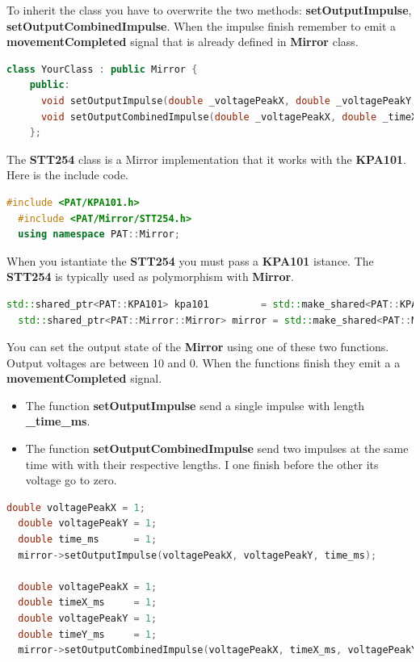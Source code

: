 To inherit the class you have to overwrite the two methods:
\textbf{setOutputImpulse}, \textbf{setOutputCombinedImpulse}. When the
impulse finish remember to emit a \textbf{movementCompleted} signal that
is already defined in \textbf{Mirror} class.

\begin{lstlisting}[language=c++, gobble=2]
  class YourClass : public Mirror {
    public:
      void setOutputImpulse(double _voltagePeakX, double _voltagePeakY, double _time_ms) override;
      void setOutputCombinedImpulse(double _voltagePeakX, double _timeX_ms, double _voltagePeakY, double _timeY_ms) override;
    };
\end{lstlisting}


The \textbf{STT254} class is a Mirror implementation that it works with
the \textbf{KPA101}. Here is the include code.

\begin{lstlisting}[language=c++, gobble=2]
  #include <PAT/KPA101.h>
  #include <PAT/Mirror/STT254.h>
  using namespace PAT::Mirror;
\end{lstlisting}

When you istantiate the \textbf{STT254} you must pass a \textbf{KPA101}
istance. The \textbf{STT254} is typically used as polymorphism with
\textbf{Mirror}.

\begin{lstlisting}[language=c++, gobble=2]
  std::shared_ptr<PAT::KPA101> kpa101         = std::make_shared<PAT::KPA101>();
  std::shared_ptr<PAT::Mirror::Mirror> mirror = std::make_shared<PAT::Mirror::STT254>(kpa101);
\end{lstlisting}

You can set the output state of the \textbf{Mirror} using one of these
two functions. Output voltages are between 10 and 0. When the functions
finish they emit a a \textbf{movementCompleted} signal.

\begin{itemize}
  \tightlist
  \item
        The function \textbf{setOutputImpulse} send a single impulse with
        length \textbf{\_time\_ms}.
  \item
        The function \textbf{setOutputCombinedImpulse} send two impulses at
        the same time with with their respective lengths. I one finish before
        the other its voltage go to zero.
\end{itemize}

\begin{lstlisting}[language=c++, gobble=2]
  double voltagePeakX = 1;
  double voltagePeakY = 1;
  double time_ms      = 1;
  mirror->setOutputImpulse(voltagePeakX, voltagePeakY, time_ms);
  
  double voltagePeakX = 1;
  double timeX_ms     = 1;
  double voltagePeakY = 1;
  double timeY_ms     = 1;
  mirror->setOutputCombinedImpulse(voltagePeakX, timeX_ms, voltagePeakY, timeY_ms);
\end{lstlisting}


